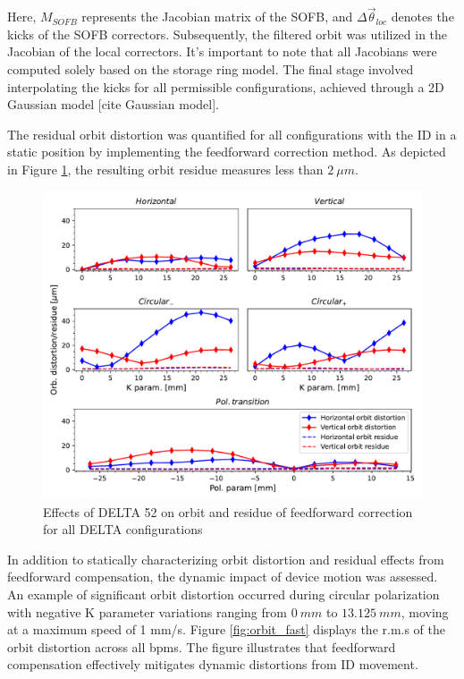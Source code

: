 \documentclass[a4paper,
               keeplastbox,   %
               ]{jacow}
\begin{document}
Here, $M_{SOFB}$ represents the Jacobian matrix of the SOFB, and $\Delta\Vec{\theta}_{loc}$ denotes the kicks of the SOFB correctors. Subsequently, the filtered orbit was utilized in the Jacobian of the local correctors. It's important to note that all Jacobians were computed solely based on the storage ring model. The final stage involved interpolating the kicks for all permissible configurations, achieved through a 2D Gaussian model [cite Gaussian model].

The residual orbit distortion was quantified for all configurations with the  ID in a static position by implementing the feedforward correction method. As depicted in Figure \ref{fig:orbit_slow},  the resulting orbit residue measures less than $\SI{2}{\mu m}$.

\begin{figure}[!h]
    \centering
   \includegraphics[width=\columnwidth]{THPS18_f2.pdf}
   \caption{Effects of DELTA 52 on orbit and residue of feedforward correction for all DELTA configurations}
   \label{fig:orbit_slow}
\end{figure}

In addition to statically characterizing orbit distortion and residual effects from feedforward compensation, the dynamic impact of device motion was assessed. An example of significant orbit distortion occurred during circular polarization with negative K parameter variations ranging from $\SI{0}{mm}$ to $\SI{13.125}{mm}$, moving at a maximum speed of 1 mm/s. Figure \ref{fig:orbit_fast} displays the r.m.s of the orbit distortion across all bpms. The figure illustrates that feedforward compensation effectively mitigates dynamic distortions from ID movement.
\end{document}
